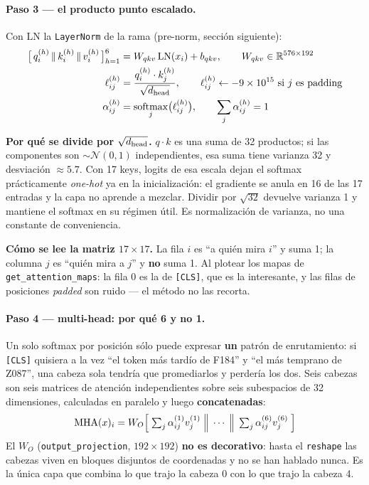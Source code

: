 \documentclass[11pt,a4paper]{article}
\newcommand{\code}[1]{\texttt{\small #1}}
\begin{document}
\paragraph{Paso 3 --- el producto punto escalado.} Con $\mathrm{LN}$ la \code{LayerNorm} de la rama
(pre-norm, sección siguiente):
\begin{align}
\bigl[\,q^{(h)}_i \,\|\, k^{(h)}_i \,\|\, v^{(h)}_i\,\bigr]_{h=1}^{6}
  &= W_{qkv}\,\mathrm{LN}(x_i) + b_{qkv}, \qquad W_{qkv}\in\mathbb{R}^{576\times192} \\
\ell^{(h)}_{ij} &= \frac{q^{(h)}_i\cdot k^{(h)}_j}{\sqrt{d_{\rm head}}},
  \qquad \ell^{(h)}_{ij} \leftarrow -9\times10^{15}\ \text{si } j \text{ es padding} \\
\alpha^{(h)}_{ij} &= \operatorname*{softmax}_{j}\bigl(\ell^{(h)}_{ij}\bigr),
  \qquad \sum_j \alpha^{(h)}_{ij} = 1
\end{align}

\textbf{Por qué se divide por $\sqrt{d_{\rm head}}$.} $q\cdot k$ es una suma de 32 productos; si las
componentes son $\sim\mathcal{N}(0,1)$ independientes, esa suma tiene varianza 32 y desviación
$\approx5.7$. Con 17 keys, logits de esa escala dejan el softmax prácticamente \emph{one-hot} ya en
la inicialización: el gradiente se anula en 16 de las 17 entradas y la capa no aprende a mezclar.
Dividir por $\sqrt{32}$ devuelve varianza 1 y mantiene el softmax en su régimen útil. Es
normalización de varianza, no una constante de conveniencia.

\textbf{Cómo se lee la matriz $17\times17$.} La fila $i$ es ``a quién mira $i$'' y suma 1; la columna
$j$ es ``quién mira a $j$'' y \textbf{no} suma 1. Al plotear los mapas de
\code{get\_attention\_maps}: la fila 0 es la de \code{[CLS]}, que es la interesante, y las filas de
posiciones \emph{padded} son ruido --- el método no las recorta.

\paragraph{Paso 4 --- multi-head: por qué 6 y no 1.} Un solo softmax por posición sólo puede expresar
\textbf{un} patrón de enrutamiento: si \code{[CLS]} quisiera a la vez ``el token más tardío de F184''
y ``el más temprano de Z087'', una cabeza sola tendría que promediarlos y perdería los dos. Seis
cabezas son seis matrices de atención independientes sobre seis subespacios de 32 dimensiones,
calculadas en paralelo y luego \textbf{concatenadas}:
\begin{equation}
\mathrm{MHA}(x)_i = W_O\Bigl[\;\textstyle\sum_j \alpha^{(1)}_{ij} v^{(1)}_j
 \;\Big\|\;\cdots\;\Big\|\; \sum_j \alpha^{(6)}_{ij} v^{(6)}_j\;\Bigr]
\end{equation}
El $W_O$ (\code{output\_projection}, $192\times192$) \textbf{no es decorativo}: hasta el
\code{reshape} las cabezas viven en bloques disjuntos de coordenadas y no se han hablado nunca. Es la
única capa que combina lo que trajo la cabeza 0 con lo que trajo la cabeza 4.
\end{document}
